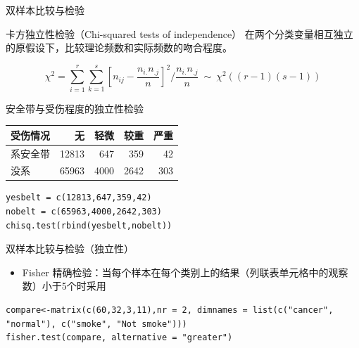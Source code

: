 \documentclass[presentation]{beamer}
\begin{document}
\begin{frame}[fragile,label={sec:org9ba2478}]{双样本比较与检验}
 \begin{block}{卡方独立性检验（Chi-squared tests of independence）}
在两个分类变量相互独立的原假设下，比较理论频数和实际频数的吻合程度。

$$\chi^2=\sum_{i=1}^r\sum_{k=1}^s[n_{ij}-\frac{n_{i.}n_{.j}}{n}]^2/\frac{n_{i.}n_{.j}}{n} \ \sim \ \chi^2((r-1)(s-1))$$

安全带与受伤程度的独立性检验  

\begin{center}
\begin{tabular}{lrrrr}
受伤情况 & 无 & 轻微 & 较重 & 严重\\
\hline
系安全带 & 12813 & 647 & 359 & 42\\
没系 & 65963 & 4000 & 2642 & 303\\
\end{tabular}
\end{center}

\begin{verbatim}
yesbelt = c(12813,647,359,42)
nobelt = c(65963,4000,2642,303)
chisq.test(rbind(yesbelt,nobelt))
\end{verbatim}
\end{block}
\end{frame}
\begin{frame}[fragile,label={sec:orgc0fe53e}]{双样本比较与检验（独立性）}
 \begin{itemize}
\item Fisher 精确检验：当每个样本在每个类别上的结果（列联表单元格中的观察数）小于5个时采用
\end{itemize}
\begin{verbatim}
compare<-matrix(c(60,32,3,11),nr = 2, dimnames = list(c("cancer", "normal"), c("smoke", "Not smoke")))
fisher.test(compare, alternative = "greater")
\end{verbatim}
\end{frame}
\end{document}
